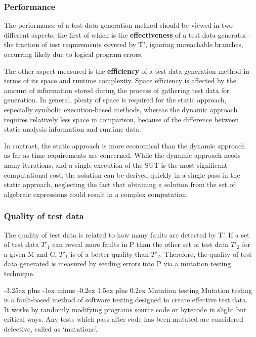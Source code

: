 \documentclass{icldt}
\makeatletter
\numberwithin{equation}{section}       %
\renewcommand{\paragraph}{\@startsection{paragraph}{4}{0ex}%
   {-3.25ex plus -1ex minus -0.2ex}%
   {1.5ex plus 0.2ex}%
   {\normalfont\normalsize\bfseries}}
\makeatother
\begin{document}
{\subsubsection{Performance}
The performance of a test data generation method should be viewed in two different aspects, the first of which is the \textbf{effectiveness} of a test data generator - the fraction of test requirements covered by T', ignoring unreachable branches, occurring likely due to logical program errors.

The other aspect measured is the \textbf{efficiency} of a test data generation method in terms of its space and runtime complexity. Space efficiency is affected by the amount of information stored during the process of gathering test data for generation. In general, plenty of space is required for the static approach, especially symbolic execution-based methods, whereas the dynamic approach requires relatively less space in comparison, because of the difference between static analysis information and runtime data.

In contrast, the static approach is more economical than the dynamic approach as far as time requirements are concerned. While the dynamic approach needs many iterations, and a single execution of the SUT is the most significant computational cost, the solution can be derived quickly in a single pass in the static approach, neglecting the fact that obtaining a solution from the set of algebraic expressions could result in a complex computation.

\subsubsection{Quality of test data}
The quality of test data is related to how many faults are detected by T'. If a set of test data $T'_1$ can reveal more faults in P than the other set of test data $T'_2$ for a given M and C, $T'_1$ is of a better quality than $T'_2$. Therefore, the quality of test data generated is measured by seeding errors into P via a mutation testing technique.

\paragraph{Mutation testing}
Mutation testing is a fault-based method of software testing designed to create effective test data. It works by randomly modifying programs source code or bytecode in slight but critical ways. Any tests which pass after code has been mutated are considered defective, called as `mutations'.

}
\end{document}
